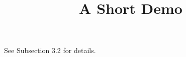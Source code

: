 \documentclass[article]{jss}
\title{A Short Demo}
\begin{document}
See Subsection 3.2 for details.
\end{document}
